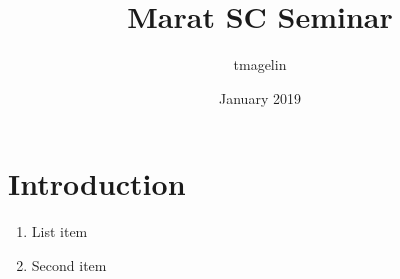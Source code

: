 \documentclass{article}
\title{Marat SC Seminar}
\author{tmagelin }
\date{January 2019}
\begin{document}
\maketitle

\section{Introduction}

\begin{enumerate}
    \item List item
    \item Second item
\end{enumerate}
\end{document}
